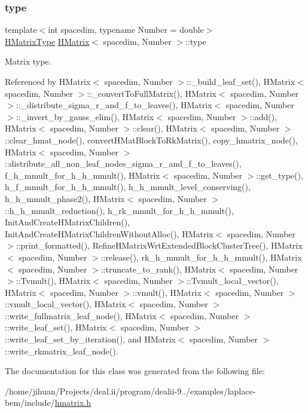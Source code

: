 \mbox{\label{classHMatrix_a89ef60f3ba737c04708195ca0bb13620}} 
\subsubsection{\texorpdfstring{type}{type}}
{\footnotesize\ttfamily template$<$int spacedim, typename Number = double$>$ \\
\hyperlink{hmatrix_8h_ac04719e202c88f36e4533fe1d326a494}{H\+Matrix\+Type} \hyperlink{classHMatrix}{H\+Matrix}$<$ spacedim, Number $>$\+::type\hspace{0.3cm}{\ttfamily [private]}}

Matrix type. 

Referenced by H\+Matrix$<$ spacedim, Number $>$\+::\+\_\+build\+\_\+leaf\+\_\+set(), H\+Matrix$<$ spacedim, Number $>$\+::\+\_\+convert\+To\+Full\+Matrix(), H\+Matrix$<$ spacedim, Number $>$\+::\+\_\+distribute\+\_\+sigma\+\_\+r\+\_\+and\+\_\+f\+\_\+to\+\_\+leaves(), H\+Matrix$<$ spacedim, Number $>$\+::\+\_\+invert\+\_\+by\+\_\+gauss\+\_\+elim(), H\+Matrix$<$ spacedim, Number $>$\+::add(), H\+Matrix$<$ spacedim, Number $>$\+::clear(), H\+Matrix$<$ spacedim, Number $>$\+::clear\+\_\+hmat\+\_\+node(), convert\+H\+Mat\+Block\+To\+Rk\+Matrix(), copy\+\_\+hmatrix\+\_\+node(), H\+Matrix$<$ spacedim, Number $>$\+::distribute\+\_\+all\+\_\+non\+\_\+leaf\+\_\+nodes\+\_\+sigma\+\_\+r\+\_\+and\+\_\+f\+\_\+to\+\_\+leaves(), f\+\_\+h\+\_\+mmult\+\_\+for\+\_\+h\+\_\+h\+\_\+mmult(), H\+Matrix$<$ spacedim, Number $>$\+::get\+\_\+type(), h\+\_\+f\+\_\+mmult\+\_\+for\+\_\+h\+\_\+h\+\_\+mmult(), h\+\_\+h\+\_\+mmult\+\_\+level\+\_\+conserving(), h\+\_\+h\+\_\+mmult\+\_\+phase2(), H\+Matrix$<$ spacedim, Number $>$\+::h\+\_\+h\+\_\+mmult\+\_\+reduction(), h\+\_\+rk\+\_\+mmult\+\_\+for\+\_\+h\+\_\+h\+\_\+mmult(), Init\+And\+Create\+H\+Matrix\+Children(), Init\+And\+Create\+H\+Matrix\+Children\+Without\+Alloc(), H\+Matrix$<$ spacedim, Number $>$\+::print\+\_\+formatted(), Refine\+H\+Matrix\+Wrt\+Extended\+Block\+Cluster\+Tree(), H\+Matrix$<$ spacedim, Number $>$\+::release(), rk\+\_\+h\+\_\+mmult\+\_\+for\+\_\+h\+\_\+h\+\_\+mmult(), H\+Matrix$<$ spacedim, Number $>$\+::truncate\+\_\+to\+\_\+rank(), H\+Matrix$<$ spacedim, Number $>$\+::\+Tvmult(), H\+Matrix$<$ spacedim, Number $>$\+::\+Tvmult\+\_\+local\+\_\+vector(), H\+Matrix$<$ spacedim, Number $>$\+::vmult(), H\+Matrix$<$ spacedim, Number $>$\+::vmult\+\_\+local\+\_\+vector(), H\+Matrix$<$ spacedim, Number $>$\+::write\+\_\+fullmatrix\+\_\+leaf\+\_\+node(), H\+Matrix$<$ spacedim, Number $>$\+::write\+\_\+leaf\+\_\+set(), H\+Matrix$<$ spacedim, Number $>$\+::write\+\_\+leaf\+\_\+set\+\_\+by\+\_\+iteration(), and H\+Matrix$<$ spacedim, Number $>$\+::write\+\_\+rkmatrix\+\_\+leaf\+\_\+node().



The documentation for this class was generated from the following file\+:\begin{DoxyCompactItemize}
\item 
/home/jihuan/\+Projects/deal.\+ii/program/dealii-\/9../examples/laplace-\/bem/include/\hyperlink{hmatrix_8h}{hmatrix.\+h}\end{DoxyCompactItemize}
